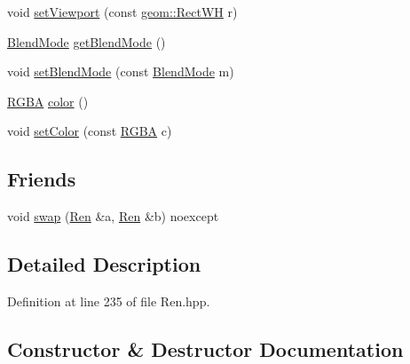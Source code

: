 \begin{DoxyCompactItemize}
\item 
void \mbox{\hyperlink{classrolmodl_1_1blend_mode_1_1_ren_a5481da4b82f5d1ab9d7df92a99fecb52}{set\+Viewport}} (const \mbox{\hyperlink{structrolmodl_1_1geom_1_1_rect_w_h}{geom\+::\+Rect\+WH}} r)
\item 
\mbox{\hyperlink{namespacerolmodl_a642c095a75ddf840ce3484384ee5c822}{Blend\+Mode}} \mbox{\hyperlink{classrolmodl_1_1blend_mode_1_1_ren_a48f71032a3ed6d681a89254444f891aa}{get\+Blend\+Mode}} ()
\item 
void \mbox{\hyperlink{classrolmodl_1_1blend_mode_1_1_ren_a75df23fec97e212c0a266fe6158a460e}{set\+Blend\+Mode}} (const \mbox{\hyperlink{namespacerolmodl_a642c095a75ddf840ce3484384ee5c822}{Blend\+Mode}} m)
\item 
\mbox{\hyperlink{structrolmodl_1_1_r_g_b_a}{R\+G\+BA}} \mbox{\hyperlink{classrolmodl_1_1blend_mode_1_1_ren_a0c5c633cd7adcb0b2a6f108e1afd4528}{color}} ()
\item 
void \mbox{\hyperlink{classrolmodl_1_1blend_mode_1_1_ren_a9a417102db6d0f8f078a0b4493d41feb}{set\+Color}} (const \mbox{\hyperlink{structrolmodl_1_1_r_g_b_a}{R\+G\+BA}} c)
\end{DoxyCompactItemize}
\subsection*{Friends}
\begin{DoxyCompactItemize}
\item 
void \mbox{\hyperlink{classrolmodl_1_1blend_mode_1_1_ren_ae62e12d00441a413d77930be0628f821}{swap}} (\mbox{\hyperlink{classrolmodl_1_1blend_mode_1_1_ren}{Ren}} \&a, \mbox{\hyperlink{classrolmodl_1_1blend_mode_1_1_ren}{Ren}} \&b) noexcept
\end{DoxyCompactItemize}


\subsection{Detailed Description}


Definition at line 235 of file Ren.\+hpp.



\subsection{Constructor \& Destructor Documentation}
\mbox{\label{classrolmodl_1_1blend_mode_1_1_ren_a5239bd224f0a250c8c8d58ca26d43394}} 
